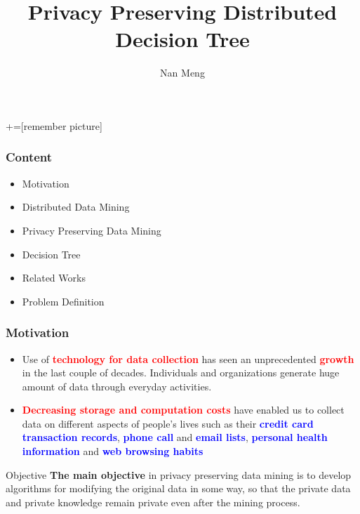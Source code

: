 \documentclass{beamer} %
\author{Nan Meng}
\title{Privacy Preserving Distributed Decision Tree}
\institute[] %
{
University of Hong Kong \\ %
\medskip
\textit{u3003637@connect.hku.hk} %
}
\newcommand{\blue}[1]{\textcolor{blue}{#1}}
\newcommand{\red}[1]{\textcolor{red}{#1}}
\begin{document}
+=[remember picture]

\everymath{\displaystyle}


\begin{frame}
  \titlepage
\end{frame}



\begin{frame}
\frametitle{Content}
\begin{itemize} \itemsep16pt \parskip0pt 
\item Motivation
\item Distributed Data Mining
\item Privacy Preserving Data Mining
\item Decision Tree
\item Related Works
\item Problem Definition
\end{itemize}
\end{frame}


\begin{frame}
\frametitle{Motivation}
\begin{itemize} \itemsep16pt \parskip0pt 
\item Use of \red{\bf technology for data collection} has seen an unprecedented \red{\bf growth} in the last couple of decades. Individuals and organizations generate huge amount of data through everyday activities.
\item \red{\bf Decreasing storage and computation costs} have enabled us to collect data on different aspects of people's lives such as their \blue{\bf credit card transaction records}, \blue{\bf phone call} and \blue{\bf email lists}, \blue{\bf personal health information} and \blue{\bf web browsing habits}
\end{itemize}


\begin{block}{Objective}
{\bf The main objective} in privacy preserving data mining is
to develop algorithms for modifying the original data
in some way, so that the private data and private
knowledge remain private even after the mining process.
\end{block}
\end{frame}
\end{document}
